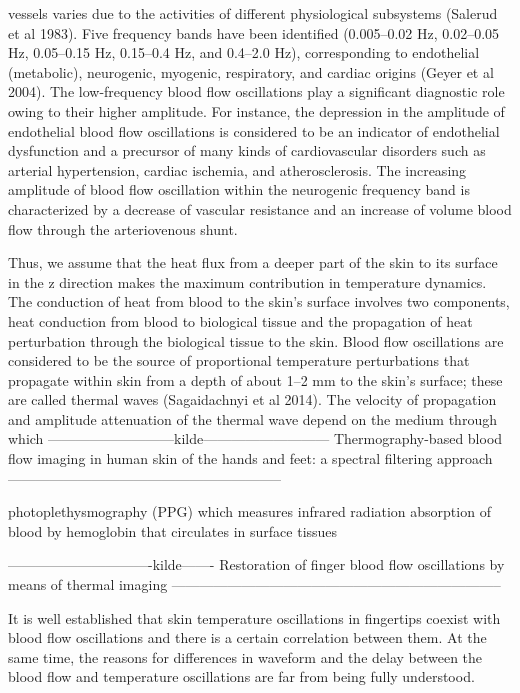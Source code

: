 vessels varies due to the activities of different physiological subsystems (Salerud et al
1983). Five frequency bands have been identified (0.005–0.02 Hz, 0.02–0.05 Hz, 0.05–0.15
Hz, 0.15–0.4 Hz, and 0.4–2.0 Hz), corresponding to endothelial (metabolic), neurogenic,
myogenic, respiratory, and cardiac origins (Geyer et al 2004). The low-frequency blood flow
oscillations play a significant diagnostic role owing to their higher amplitude. For instance,
the depression in the amplitude of endothelial blood flow oscillations is considered to be an
indicator of endothelial dysfunction and a precursor of many kinds of cardiovascular disorders
such as arterial hypertension, cardiac ischemia, and atherosclerosis. The increasing amplitude
of blood flow oscillation within the neurogenic frequency band is characterized by a decrease
of vascular resistance and an increase of volume blood flow through the arteriovenous shunt.

Thus, we
assume that the heat flux from a deeper part of the skin to its surface in the z direction makes
the maximum contribution in temperature dynamics.
The conduction of heat from blood to the skin’s surface involves two components, heat
conduction from blood to biological tissue and the propagation of heat perturbation through
the biological tissue to the skin. Blood flow oscillations are considered to be the source of proportional
temperature perturbations that propagate within skin from a depth of about 1–2 mm
to the skin’s surface; these are called thermal waves (Sagaidachnyi et al 2014). The velocity
of propagation and amplitude attenuation of the thermal wave depend on the medium through
which
---------------------------kilde---------------------------
Thermography-based blood flow imaging in human
skin of the hands and feet: a spectral filtering
approach
-----------------------------------------------------------


photoplethysmography (PPG) which measures infrared radiation absorption of
blood by hemoglobin that circulates in surface tissues

-------------------------------kilde-------
Restoration of finger blood flow oscillations by means of thermal imaging
-----------------------------------------------------------------------


It is well established that skin temperature oscillations in fingertips coexist
with blood flow oscillations and there is a certain correlation between them.
At the same time, the reasons for differences in waveform and the delay
between the blood flow and temperature oscillations are far from being fully
understood.

